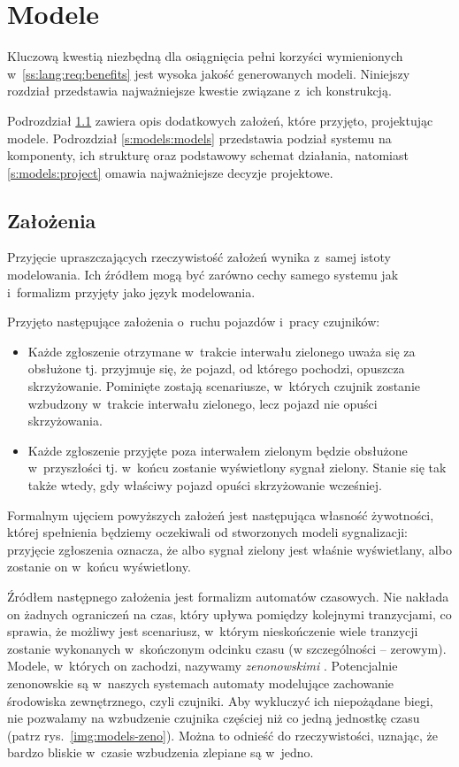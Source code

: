 \documentclass{pracamgr}
\newcommand{\imgr}[1]{rys.~\ref{#1}}
\theoremstyle{plain}
\begin{document}
\chapter{Modele}
\label{c:models}
Kluczową kwestią niezbędną dla osiągnięcia pełni korzyści wymienionych
w~\ref{ss:lang:req:benefits} jest wysoka jakość generowanych
modeli. Niniejszy rozdział przedstawia najważniejsze kwestie związane
z~ich konstrukcją.

Podrozdział \ref{s:models:assumptions} zawiera opis dodatkowych
założeń, które przyjęto, projektując modele. Podrozdział
\ref{s:models:models} przedstawia podział systemu na komponenty, ich
strukturę oraz podstawowy schemat działania, natomiast
\ref{s:models:project} omawia najważniejsze decyzje projektowe.

\section{Założenia}
\label{s:models:assumptions}

Przyjęcie upraszczających rzeczywistość założeń wynika z~samej istoty
modelowania. Ich źródłem mogą być zarówno cechy samego systemu jak
i~formalizm przyjęty jako język modelowania.

Przyjęto następujące założenia o~ruchu pojazdów i~pracy czujników:
\begin{itemize}
  \item Każde zgłoszenie otrzymane w~trakcie interwału zielonego uważa
  się za obsłużone tj. przyjmuje się, że pojazd, od którego pochodzi,
  opuszcza skrzyżowanie. Pominięte zostają scenariusze, w~których
  czujnik zostanie wzbudzony w~trakcie interwału zielonego, lecz
  pojazd nie opuści skrzyżowania.
  \item Każde zgłoszenie przyjęte poza interwałem zielonym będzie
  obsłużone w~przyszłości tj. w~końcu zostanie wyświetlony sygnał
  zielony. Stanie się tak także wtedy, gdy właściwy pojazd opuści
  skrzyżowanie wcześniej. 
\end{itemize}
Formalnym ujęciem powyższych założeń jest następująca własność
żywotności, której spełnienia będziemy oczekiwali od stworzonych
modeli sygnalizacji: przyjęcie zgłoszenia oznacza, że albo sygnał
zielony jest właśnie wyświetlany, albo zostanie on w~końcu
wyświetlony.

Źródłem następnego założenia jest formalizm automatów czasowych. Nie
nakłada on żadnych ograniczeń na czas, który upływa pomiędzy kolejnymi
tranzycjami, co sprawia, że możliwy jest scenariusz, w~którym
nieskończenie wiele tranzycji zostanie wykonanych w~skończonym odcinku
czasu (w szczególności -- zerowym). Modele, w~których on zachodzi,
nazywamy \emph{zenonowskimi} \cite{henz-94}.  Potencjalnie zenonowskie
są w~naszych systemach automaty modelujące zachowanie środowiska
zewnętrznego, czyli czujniki. Aby wykluczyć ich niepożądane biegi, nie
pozwalamy na wzbudzenie czujnika częściej niż co jedną jednostkę czasu
(patrz \imgr{img:models-zeno}). Można to odnieść do rzeczywistości,
uznając, że bardzo bliskie w~czasie wzbudzenia zlepiane są w~jedno.
\end{document}
